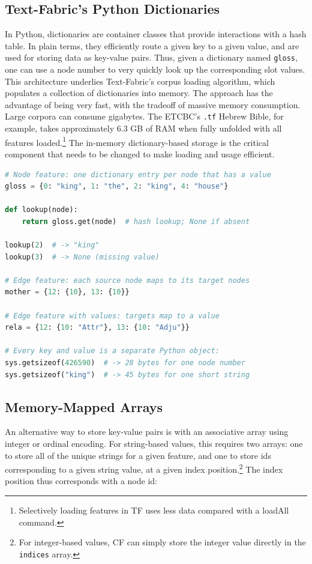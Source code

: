 \documentclass[11pt,a4paper]{article}
\begin{document}
\subsection{Text-Fabric's Python Dictionaries}

In Python, dictionaries are container classes that provide interactions with a hash table.
In plain terms, they efficiently route a given key to a given value, and are used for storing 
data as key-value pairs. Thus, given a dictionary named \texttt{gloss},
one can use a node number to very quickly look up the corresponding
slot values. This architecture underlies Text-Fabric's corpus loading algorithm, which populates
a collection of dictionaries into memory. The approach has the advantage of being very fast, with
the tradeoff of massive memory consumption. Large corpora can consume gigabytes. The ETCBC's 
\texttt{.tf} Hebrew Bible, for example, takes approximately 6.3 GB of RAM when fully unfolded with all features loaded.\footnote{
    Selectively loading features in TF uses less data compared with a loadAll command.
}
The in-memory dictionary-based storage is the critical component that needs to be changed to make
loading and usage efficient.

\begin{lstlisting}[language=Python, caption=Dictionary-based storage in Text-Fabric]
# Node feature: one dictionary entry per node that has a value
gloss = {0: "king", 1: "the", 2: "king", 4: "house"}

def lookup(node):
    return gloss.get(node)  # hash lookup; None if absent

lookup(2)  # -> "king"
lookup(3)  # -> None (missing value)

# Edge feature: each source node maps to its target nodes
mother = {12: {10}, 13: {10}}

# Edge feature with values: targets map to a value
rela = {12: {10: "Attr"}, 13: {10: "Adju"}}

# Every key and value is a separate Python object:
sys.getsizeof(426590)  # -> 28 bytes for one node number
sys.getsizeof("king")  # -> 45 bytes for one short string
\end{lstlisting}

\subsection{Memory-Mapped Arrays}

An alternative way to store key-value pairs is with an associative array using integer or ordinal
encoding. For string-based values, this requires two arrays: one to store all of the unique strings
for a given feature, and one to store ids corresponding to a given string value, at a given index
position.\footnote{
    For integer-based values, CF can simply store the integer value directly in the \texttt{indices} array.
}
The index position thus corresponds with a node id:
\end{document}
